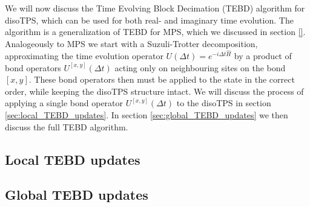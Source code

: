 We will now discuss the Time Evolving Block Decimation (TEBD) algorithm for disoTPS, which can be used for both real- and imaginary time evolution. The algorithm is a generalization of TEBD for MPS, which we discussed in section \ref{}. Analogeously to MPS we start with a Suzuli-Trotter decomposition, approximating the time evolution operator $U\left(\Delta t\right) = e^{-i\Delta t \hat{H}}$ by a product of bond operators $U^{[x, y]}\left(\Delta t\right)$ acting only on neighbouring sites on the bond $[x, y]$. These bond operators then must be applied to the state in the correct order, while keeping the disoTPS structure intact. We will discuss the process of applying a single bond operator $U^{[x,y]}\left(\Delta t\right)$ to the disoTPS in section \ref{sec:local_TEBD_updates}. In section \ref{sec:global_TEBD_updates} we then discuss the full TEBD algorithm.

\subsection{Local TEBD updates}
\label{sec:disoTPS_TEBD_local_updates}


\subsection{Global TEBD updates}
\label{sec:disoTPS_TEBD_global_updates}
